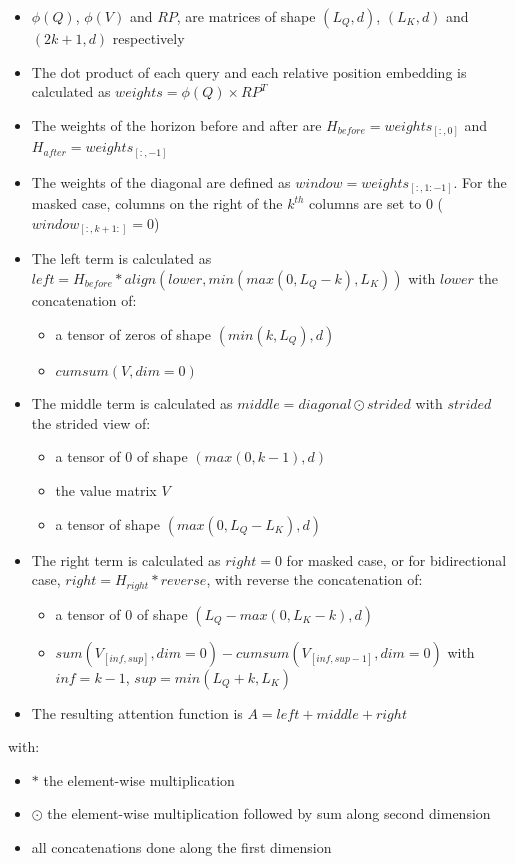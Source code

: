 \begin{itemize}
	\item
	$\phi(Q)$, $\phi(V)$ and $RP$, are matrices of shape
	$(L_Q, d)$, $(L_K, d)$ and $(2k+1, d)$ respectively
	\item
	The dot product of each query and each relative position embedding is
	calculated as $weights = \phi(Q) \times RP^T$
	\item
	The weights of the horizon before and after are
	$H_{before} = weights_{[:, 0]}$ and
	$H_{after} = weights_{[:, -1]}$
	\item
	The weights of the diagonal are defined as
	$window = weights_{[:,1:-1]}$. For the masked case, columns on the
	right of the $k^{th}$ columns are set to 0
	($window_{[:, k+1:]} = 0$)
	\item
	The left term is calculated as
	$left = H_{before} * align(lower, min(max(0, L_Q-k), L_K))$ with
	$lower$ the concatenation of:
	
	\begin{itemize}
		\item
		a tensor of zeros of shape $\left(min(k, L_Q), d\right)$
		\item
		$cumsum(V, dim=0)$
	\end{itemize}
	\item
	The middle term is calculated as $middle = diagonal \odot strided$
	with $strided$ the strided view of:
	
	\begin{itemize}
		\item
		a tensor of 0 of shape $(max(0, k-1), d)$
		\item
		the value matrix $V$
		\item
		a tensor of shape $(max(0, L_Q-L_K), d)$
	\end{itemize}
	\item
	The right term is calculated as $right = 0$ for masked case, or for
	bidirectional case, $right = H_{right} * reverse$, with reverse the
	concatenation of:
	
	\begin{itemize}
		\item
		a tensor of 0 of shape $(L_Q-max(0, L_K-k), d)$
		\item
		$sum(V_{[inf, sup]}, dim=0) - cumsum(V_{[inf, sup-1]}, dim=0)$
		with $inf = k-1$, $sup = min(L_Q+k, L_K)$
	\end{itemize}
	\item
	The resulting attention function is $A = left + middle + right$
\end{itemize}

with:

\begin{itemize}
	\item
	$*$ the element-wise multiplication
	\item
	$\odot$ the element-wise multiplication followed by sum along second
	dimension
	\item
	all concatenations done along the first dimension
\end{itemize}

\endinput
